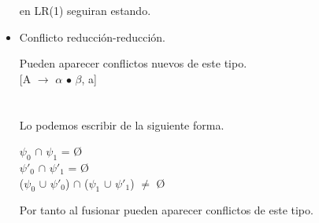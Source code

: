 \documentclass[\main/ApuntesPL.tex]{subfiles}
\begin{document}
\begin{itemize}
            en LR(1) seguiran estando.
          \item Conflicto reducción-reducción.
            \par
            Pueden aparecer conflictos nuevos de este tipo.\\\relax
            \vspace{2mm}
            [A $\rightarrow$ $\alpha$ $\bullet$ $\beta$, a]\\\\\\\relax
            Lo podemos escribir de la siguiente forma.\\

            \begin{center}
              \begin{minipage}{.3\textwidth}
              \end{minipage}%
              \begin{minipage}{.8\textwidth}
                \par
                $\psi_0$ $\cap$ $\psi_1$ = \O\\
                $\psi'_0$ $\cap$ $\psi'_1$ = \O\\
                ($\psi_0$ $\cup$ $\psi'_0$) $\cap$ ($\psi_1$ $\cup$ $\psi'_1$)
                $\neq$ \O\\
                \vspace*{2mm}

                Por tanto al fusionar pueden aparecer conflictos de este tipo.
              \end{minipage}
            \end{center}
        \end{itemize}
\end{document}
